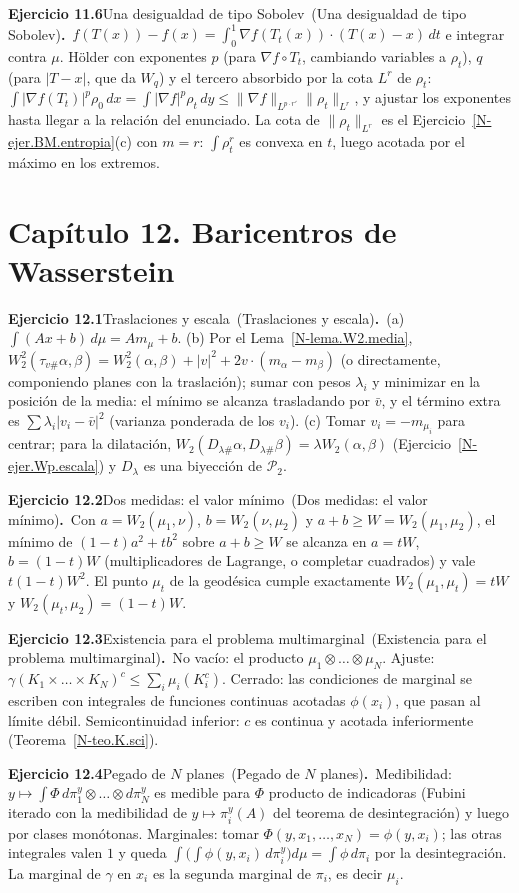 \documentclass[11pt,a4paper]{amsart}
\theoremstyle{remark}
\theoremstyle{definition}
\numberwithin{subsection}{section}
\numberwithin{equation}{section}
\newcommand{\ejlabel}[2]{\par\medskip\noindent\textbf{Ejercicio #1}\ifx\relax#2\relax\else\ (#2)\fi\textbf{.}\ }
\begin{document}
\ejlabel{11.6}{Una desigualdad de tipo Sobolev}$f(T(x))-f(x)=\int_0^1\nabla f(T_t(x))\cdot(T(x)-x)\,dt$ e integrar contra $\mu$. Hölder con exponentes $p$ (para $\nabla f\circ T_t$, cambiando variables a $\rho_t$), $q$ (para $|T-x|$, que da $W_q$) y el tercero absorbido por la cota $L^r$ de $\rho_t$: $\int|\nabla f(T_t)|^p\rho_0\,dx=\int|\nabla f|^p\rho_t\,dy\le\|\nabla f\|_{L^{p\cdot r'}}\|\rho_t\|_{L^r}$, y ajustar los exponentes hasta llegar a la relación del enunciado. La cota de $\|\rho_t\|_{L^r}$ es el Ejercicio~\ref{N-ejer.BM.entropia}(c) con $m=r$: $\int\rho_t^r$ es convexa en $t$, luego acotada por el máximo en los extremos.

\section*{Capítulo 12. Baricentros de Wasserstein}
\ejlabel{12.1}{Traslaciones y escala}(a) $\int(Ax+b)\,d\mu=Am_\mu+b$. (b) Por el Lema~\ref{N-lema.W2.media}, $W_2^2(\tau_{v\#}\alpha,\beta)=W_2^2(\alpha,\beta)+|v|^2+2v\cdot(m_\alpha-m_\beta)$ (o directamente, componiendo planes con la traslación); sumar con pesos $\lambda_i$ y minimizar en la posición de la media: el mínimo se alcanza trasladando por $\bar v$, y el término extra es $\sum\lambda_i|v_i-\bar v|^2$ (varianza ponderada de los $v_i$). (c) Tomar $v_i=-m_{\mu_i}$ para centrar; para la dilatación, $W_2(D_{\lambda\#}\alpha,D_{\lambda\#}\beta)=\lambda W_2(\alpha,\beta)$ (Ejercicio~\ref{N-ejer.Wp.escala}) y $D_\lambda$ es una biyección de $\mathcal P_2$.

\ejlabel{12.2}{Dos medidas: el valor mínimo}Con $a=W_2(\mu_1,\nu)$, $b=W_2(\nu,\mu_2)$ y $a+b\ge W=W_2(\mu_1,\mu_2)$, el mínimo de $(1-t)a^2+tb^2$ sobre $a+b\ge W$ se alcanza en $a=tW$, $b=(1-t)W$ (multiplicadores de Lagrange, o completar cuadrados) y vale $t(1-t)W^2$. El punto $\mu_t$ de la geodésica cumple exactamente $W_2(\mu_1,\mu_t)=tW$ y $W_2(\mu_t,\mu_2)=(1-t)W$.

\ejlabel{12.3}{Existencia para el problema multimarginal}No vacío: el producto $\mu_1\otimes\dots\otimes\mu_N$. Ajuste: $\gamma(K_1\times\dots\times K_N)^c\le\sum_i\mu_i(K_i^c)$. Cerrado: las condiciones de marginal se escriben con integrales de funciones continuas acotadas $\phi(x_i)$, que pasan al límite débil. Semicontinuidad inferior: $c$ es continua y acotada inferiormente (Teorema~\ref{N-teo.K.sci}).

\ejlabel{12.4}{Pegado de $N$ planes}Medibilidad: $y\mapsto\int\Phi\,d\pi_1^y\otimes\dots\otimes d\pi_N^y$ es medible para $\Phi$ producto de indicadoras (Fubini iterado con la medibilidad de $y\mapsto\pi_i^y(A)$ del teorema de desintegración) y luego por clases monótonas. Marginales: tomar $\Phi(y,x_1,\dots,x_N)=\phi(y,x_i)$; las otras integrales valen $1$ y queda $\int\bigl(\int\phi(y,x_i)\,d\pi_i^y\bigr)d\mu=\int\phi\,d\pi_i$ por la desintegración. La marginal de $\gamma$ en $x_i$ es la segunda marginal de $\pi_i$, es decir $\mu_i$.
\end{document}
